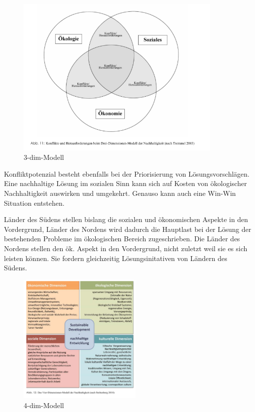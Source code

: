 \documentclass{scrartcl}
\begin{document}
\begin{figure}[htbp]
\centering
\includegraphics[width=10cm]{image_folder/dreidimensionenmodell_der_N.png}
\caption{3-dim-Modell}
\label{fig:3-dimensionen Modell}
\end{figure}

Konfliktpotenzial besteht ebenfalls bei der Priorisierung von Lösungsvorschlägen. Eine nachhaltige Lösung im sozialen Sinn kann sich auf Kosten von ökologischer Nachhaltigkeit auswirken und umgekehrt. Genauso kann auch eine Win-Win Situation entstehen.

Länder des Südens stellen bislang die sozialen und ökonomischen Aspekte in den Vordergrund, Länder des Nordens wird dadurch die Hauptlast bei der Lösung der bestehenden Probleme im ökologischen Bereich zugeschrieben. Die Länder des Nordens stellen den ök. Aspekt in den Vordergrund, nicht zuletzt weil sie es sich leisten können. Sie fordern gleichzeitig Lösungsinitativen von Ländern des Südens.

\begin{figure}[h]
\centering
\includegraphics[width=6cm]{image_folder/vierdimensionenmodell_der_N.png}
\caption{4-dim-Modell}
\label{fig:4-dimensionen Modell}
\end{figure}
\end{document}
